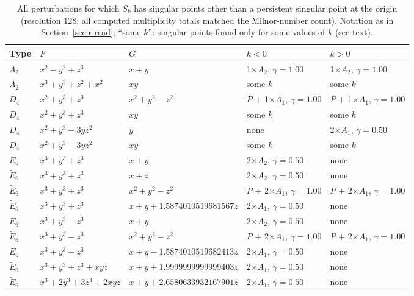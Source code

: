 \documentclass[12pt, a4paper]{article}
\theoremstyle{plain}
\theoremstyle{definition}
\theoremstyle{remark}
\theoremstyle{definition}
\begin{document}
\begin{table}[!h]
\centering
\footnotesize
\begin{adjustbox}{max width=\textwidth}
\begin{tabular}{l l l l l}
\toprule
Type & $F$ & $G$ & $k<0$ & $k>0$ \\
\midrule
$A_2$ & $x^2-y^2+z^3$ & $x+y$ & 1$\times$$A_2$, $\gamma{=}1.00$ & 1$\times$$A_2$, $\gamma{=}1.00$ \\
$A_2$ & $x^3+y^3+z^2+x^2$ & $xy$ & some $k$ & some $k$ \\
$D_4$ & $x^2+y^3+z^3$ & $x^2+y^2-z^2$ & $P$ + 1$\times$$A_1$, $\gamma{=}1.00$ & $P$ + 1$\times$$A_1$, $\gamma{=}1.00$ \\
$D_4$ & $x^2+y^3+z^3$ & $xy$ & some $k$ & some $k$ \\
$D_4$ & $x^2+y^3-3yz^2$ & $y$ & none & 2$\times$$A_1$, $\gamma{=}0.50$ \\
$D_4$ & $x^2+y^3-3yz^2$ & $xy$ & some $k$ & some $k$ \\
$\tilde E_6$ & $x^3+y^3+z^3$ & $x+y$ & 2$\times$$A_2$, $\gamma{=}0.50$ & none \\
$\tilde E_6$ & $x^3+y^3+z^3$ & $x+z$ & 2$\times$$A_2$, $\gamma{=}0.50$ & none \\
$\tilde E_6$ & $x^3+y^3+z^3$ & $x^2+y^2-z^2$ & $P$ + 2$\times$$A_1$, $\gamma{=}1.00$ & $P$ + 2$\times$$A_1$, $\gamma{=}1.00$ \\
$\tilde E_6$ & $x^3+y^3+z^3$ & $x+y+1.5874010519681567z$ & 2$\times$$A_1$, $\gamma{=}0.50$ & none \\
$\tilde E_6$ & $x^3+y^3-z^3$ & $x+y$ & 2$\times$$A_2$, $\gamma{=}0.50$ & none \\
$\tilde E_6$ & $x^3+y^3-z^3$ & $x^2+y^2-z^2$ & $P$ + 2$\times$$A_1$, $\gamma{=}1.00$ & $P$ + 2$\times$$A_1$, $\gamma{=}1.00$ \\
$\tilde E_6$ & $x^3+y^3-z^3$ & $x+y-1.5874010519682413z$ & 2$\times$$A_1$, $\gamma{=}0.50$ & none \\
$\tilde E_6$ & $x^3+y^3+z^3+xyz$ & $x+y+1.9999999999999403z$ & 2$\times$$A_1$, $\gamma{=}0.50$ & none \\
$\tilde E_6$ & $x^3+2y^3+3z^3+2xyz$ & $x+y+2.6580633932167901z$ & 2$\times$$A_1$, $\gamma{=}0.50$ & none \\
\bottomrule
\end{tabular}
\end{adjustbox}
\caption[Created singular points]{All perturbations for which $S_k$ has singular points other than a persistent singular point at the origin (resolution $128$; all computed multiplicity totals matched the Milnor-number count). Notation as in Section~\ref{sec:r-read}; ``some $k$'': singular points found only for some values of $k$ (see text).}
\label{tab:singular-created}
\end{table}
\end{document}

